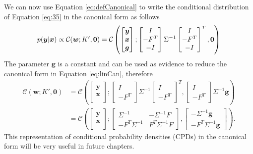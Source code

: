 \documentclass[12pt,oneside,openany,a4paper, %
afrikaans,english,
]{memoir}
\numberwithin{equation}{chapter}
\begin{document}
We can now use Equation \ref{eq:defCanonical} to write the conditional distribution of Equation \ref{eq:35} in the canonical form as follows
\begin{equation}\label{eq:linCan}
p(\bm{y}|\bm{x}) \propto \mathcal{C}(\bm{w}; K', \bm{0})\\
 =\mathcal{C}\left(
\begin{bmatrix}
\bm{y} \\
\bm{x} \\
\bm{g}
\end{bmatrix};
\begin{bmatrix}
I\\
-F^T\\
-I
\end{bmatrix}
\Sigma^{-1}
\begin{bmatrix}
I\\
-F^T\\
-I
\end{bmatrix}^T
, \bm{0}
\right)
\end{equation}
The parameter $\bm{g}$ is a constant and can be used as evidence to reduce the canonical form in Equation \ref{eq:linCan}, therefore
\begin{equation}\label{eq:conCanResult}
\begin{split}
\mathcal{C}(\bm{w}; K', \bm{0})& =\mathcal{C}\left(
\begin{bmatrix}
\bm{y} \\
\bm{x} \\
\end{bmatrix};
\begin{bmatrix}
I\\
-F^T
\end{bmatrix}
\Sigma^{-1}
\begin{bmatrix}
I\\
-F^T
\end{bmatrix}^T,
\begin{bmatrix}
I\\
-F^T
\end{bmatrix}
\Sigma^{-1}\bm{g}
\right)\\
& =\mathcal{C}\left(
\begin{bmatrix}
\bm{y} \\
\bm{x} \\
\end{bmatrix};
\begin{bmatrix}
\Sigma^{-1}  &  -\Sigma^{-1}F\\
-F^T\Sigma^{-1} & F^T\Sigma^{-1}F
\end{bmatrix}
, 
\begin{bmatrix}
-\Sigma^{-1}\bm{g}\\
-F^T\Sigma^{-1}\bm{g}
\end{bmatrix}
\right).
\end{split}
\end{equation}
This representation of conditional probability densities (CPDs) in the canonical form will be very useful in future chapters.
\end{document}
